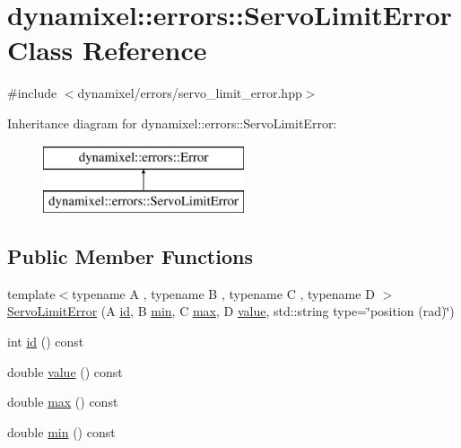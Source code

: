\hypertarget{classdynamixel_1_1errors_1_1_servo_limit_error}{}\section{dynamixel\+:\+:errors\+:\+:Servo\+Limit\+Error Class Reference}
\label{classdynamixel_1_1errors_1_1_servo_limit_error}


{\ttfamily \#include $<$dynamixel/errors/servo\+\_\+limit\+\_\+error.\+hpp$>$}

Inheritance diagram for dynamixel\+:\+:errors\+:\+:Servo\+Limit\+Error\+:\begin{figure}[H]
\begin{center}
\leavevmode
\includegraphics[height=2.000000cm]{classdynamixel_1_1errors_1_1_servo_limit_error}
\end{center}
\end{figure}
\subsection*{Public Member Functions}
\begin{DoxyCompactItemize}
\item 
{\footnotesize template$<$typename A , typename B , typename C , typename D $>$ }\\\hyperlink{classdynamixel_1_1errors_1_1_servo_limit_error_a9842f08e63de3321b3e9831ecf015522}{Servo\+Limit\+Error} (A \hyperlink{classdynamixel_1_1errors_1_1_servo_limit_error_ad77b7c7a51f0d70a67d80b052695e480}{id}, B \hyperlink{classdynamixel_1_1errors_1_1_servo_limit_error_a7efb82a1b5d008dbf9951fa0008ab71d}{min}, C \hyperlink{classdynamixel_1_1errors_1_1_servo_limit_error_ab217bc704f4e0874e4f87d650da7f5ae}{max}, D \hyperlink{classdynamixel_1_1errors_1_1_servo_limit_error_a0fea6859f0d41a69b3c5d8b0b60e6f46}{value}, std\+::string type=\char`\"{}position (rad)\char`\"{})
\item 
int \hyperlink{classdynamixel_1_1errors_1_1_servo_limit_error_ad77b7c7a51f0d70a67d80b052695e480}{id} () const 
\item 
double \hyperlink{classdynamixel_1_1errors_1_1_servo_limit_error_a0fea6859f0d41a69b3c5d8b0b60e6f46}{value} () const 
\item 
double \hyperlink{classdynamixel_1_1errors_1_1_servo_limit_error_ab217bc704f4e0874e4f87d650da7f5ae}{max} () const 
\item 
double \hyperlink{classdynamixel_1_1errors_1_1_servo_limit_error_a7efb82a1b5d008dbf9951fa0008ab71d}{min} () const 
\end{DoxyCompactItemize}


